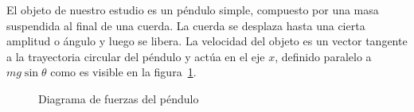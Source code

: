 \documentclass[letterpaper]{report}
\numberwithin{table}{section}
\begin{document}
El objeto de nuestro estudio es un péndulo simple, compuesto por una masa
suspendida al final de una cuerda. La cuerda se desplaza hasta una
cierta amplitud o ángulo y luego se libera. La velocidad del objeto
es un vector tangente a la trayectoria circular del péndulo y actúa
en el eje $x$, definido paralelo a $mg\sin{\theta}$ como es visible
en la figura~\ref{fig:fuerzas}.

\begin{figure}[ht]
  \centering
  \caption{Diagrama de fuerzas del péndulo}\label{fig:fuerzas}
\end{figure}
\end{document}
